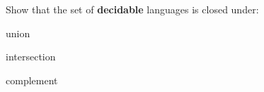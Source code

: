 \documentclass[12pt]{article}
\newenvironment{exercise}[2][Exercise]{\begin{trivlist}
\item[\hskip \labelsep {\bfseries #1}\hskip \labelsep {\bfseries #2.}]}{\end{trivlist}}
\newenvironment{solution}[1][{\color{red} Solution:}]{\begin{trivlist}
\item[\hskip \labelsep {\bfseries #1}\hskip \labelsep {\bfseries}]}{\end{trivlist}}
\begin{document}
\clearpage


\begin{exercise}{2}
Show that the set of \textbf{decidable} languages is closed under:
\begin{enumerate}[(a)]
	\setlength{\itemsep}{15em}
	\item union
	\begin{solution}
	\end{solution}
	
	\item intersection
	\begin{solution}
	\end{solution}
	
	\item complement
	\begin{solution}
	\end{solution}
\end{enumerate}
\end{exercise}
\clearpage
\end{document}

